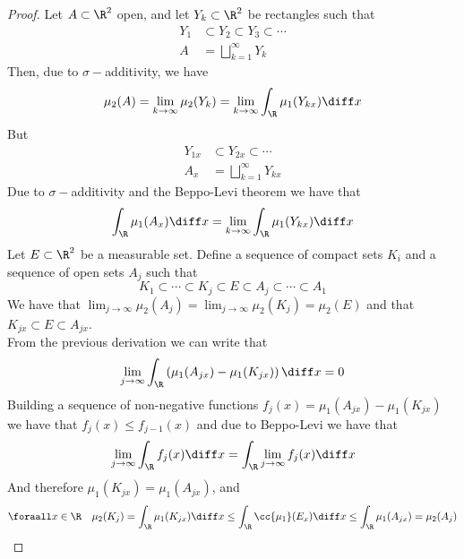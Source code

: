 \documentclass[../mmf.tex]{subfiles}
\begin{document}
\begin{proof}
	Let $A\subset\R^2$ open, and let $Y_k\subset\R^2$ be rectangles such that
	\begin{equation*}
		\begin{aligned}
			Y_1&\subset Y_2\subset Y_3\subset\cdots\\
			A&=\bigsqcup_{k=1}^\infty Y_k
		\end{aligned}
	\end{equation*}
	Then, due to $\sigma-$additivity, we have
	\begin{equation*}
		\mu_2(A)=\lim_{k\to\infty}\mu_2(Y_k)=\lim_{k\to\infty}\int_{\R}^{}\mu_1(Y_{kx})\diff x
	\end{equation*}
	But
	\begin{equation*}
		\begin{aligned}
			Y_{1x}&\subset Y_{2x}\subset\cdots\\
			A_x&=\bigsqcup_{k=1}^\infty Y_{kx}
		\end{aligned}
	\end{equation*}
	Due to $\sigma-$additivity and the Beppo-Levi theorem we have that
	\begin{equation*}
		\int_{\R}^{}\mu_1(A_x)\diff x=\lim_{k\to\infty}\int_{\R}^{}\mu_1(Y_{kx})\diff x
	\end{equation*}
	Let $E\subset\R^2$ be a measurable set. Define a sequence of compact sets $K_i$ and a sequence of open sets $A_j$ such that
	\begin{equation*}
		K_1\subset\cdots\subset K_j\subset E\subset A_j\subset\cdots\subset A_1
	\end{equation*}
	We have that $\lim_{j\to\infty}\mu_2(A_j)=\lim_{j\to\infty}\mu_2(K_j)=\mu_2(E)$ and that $K_{jx}\subset E\subset A_{jx}$.\\
	From the previous derivation we can write that
	\begin{equation*}
		\lim_{j\to\infty}\int_{\R}\left( \mu_1(A_{jx})-\mu_1(K_{jx}) \right)\diff x=0
	\end{equation*}
	Building a sequence of non-negative functions $f_j(x)=\mu_1(A_{jx})-\mu_1(K_{jx})$ we have that $f_j(x)\le f_{j-1}(x)$ and due to Beppo-Levi we have that
	\begin{equation*}
		\lim_{j\to\infty}\int_{\R}f_j(x)\diff x=\int_{\R}^{}\lim_{j\to\infty}f_{j}(x)\diff x
	\end{equation*}
	And therefore $\mu_1(K_{jx})=\mu_1(A_{jx})$, and
	\begin{equation*}
		\foraall x\in\R\quad\mu_2(K_j)=\int_{\R}^{}\mu_1(K_{jx})\diff x\le\int_{\R}^{}\cc{\mu_1}(E_x)\diff x\le\int_{\R}^{}\mu_1(A_{jx})=\mu_2(A_j)
	\end{equation*}
\end{proof}
\end{document}
